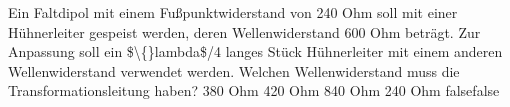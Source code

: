     {Ein Faltdipol mit einem Fußpunktwiderstand von 240 Ohm soll mit einer Hühnerleiter gespeist werden, deren Wellenwiderstand 600 Ohm beträgt. Zur Anpassung soll ein \$\textbackslash\{\}lambda\$/4 langes Stück Hühnerleiter mit einem anderen Wellenwiderstand verwendet werden. Welchen Wellenwiderstand muss die Transformationsleitung haben?}
    {380 Ohm}
    {420 Ohm}
    {840 Ohm}
    {240 Ohm}
    {false}{false}